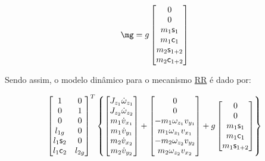 \begin{itemize}
\begin{itemize}
	\begin{equation}
	\mg =
	g \begin{bmatrix}
	0 \\
	0 \\
	m_1  \ssin_1 \\
	m_1  \ccos_1 \\
	m_2  \ssin_{1+2} \\
	m_2  \ccos_{1+2}\\
	\end{bmatrix}
	\end{equation}
	
	Sendo assim, o modelo dinâmico para o mecanismo \underline{R}\underline{R} é dado por:
	
	\begin{equation}
	\begin{bmatrix}
	1 & 0 \\
	0 & 1 \\
	0 & 0 \\
	l_{1g} & 0\\
	l_1 \mathsf{s}_{2} & 0 \\
	l_1 \mathsf{c}_{2} & l_{2g} \\
	\end{bmatrix}^T
	\begin{Bmatrix}
		\begin{bmatrix}
		J_{z_1} \dot{\omega}_{z_1} \\
		J_{z_2} \dot{\omega}_{z_2} \\
		m_1 \dot{v}_{x_1} \\ 
		m_1 \dot{v}_{y_1} \\
		m_2 \dot{v}_{x_2} \\
		m_2 \dot{v}_{y_2} \\
		\end{bmatrix}
		+
		\begin{bmatrix}
		0 \\
		0 \\
		-m_1 \omega_{z_1} v_{y_1} \\
		m_1 \omega_{z_1} v_{x_1} \\
		-m_2 \omega_{z_2} v_{y_2} \\
		m_2 \omega_{z_2} v_{x_2} \\
		\end{bmatrix}
		+
		g \begin{bmatrix}
		0 \\
		0 \\
		m_1  \mathsf{s}_1 \\
		m_1  \mathsf{c}_1 \\
		m_1  \mathsf{s}_{1+2} \\

\end{bmatrix}
\end{Bmatrix}
\end{equation}
\end{itemize}
\end{itemize}
